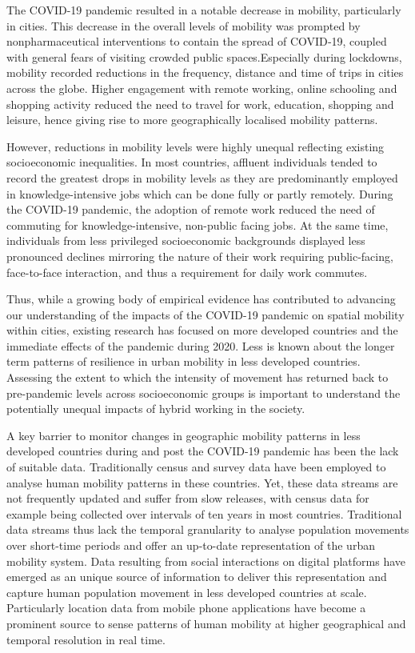 \documentclass[
  11pt,
]{article}
\begin{document}
The COVID-19 pandemic resulted in a notable decrease in mobility,
particularly in cities. This decrease in the overall levels of mobility
was prompted by nonpharmaceutical interventions to contain the spread of
COVID‐19, coupled with general fears of visiting crowded public
spaces.Especially during lockdowns, mobility recorded reductions in the
frequency, distance and time of trips in cities across the globe. Higher
engagement with remote working, online schooling and shopping activity
reduced the need to travel for work, education, shopping and leisure,
hence giving rise to more geographically localised mobility patterns.

However, reductions in mobility levels were highly unequal reflecting
existing socioeconomic inequalities. In most countries, affluent
individuals tended to record the greatest drops in mobility levels as
they are predominantly employed in knowledge-intensive jobs which can be
done fully or partly remotely. During the COVID-19 pandemic, the
adoption of remote work reduced the need of commuting for
knowledge-intensive, non-public facing jobs. At the same time,
individuals from less privileged socioeconomic backgrounds displayed
less pronounced declines mirroring the nature of their work requiring
public-facing, face-to-face interaction, and thus a requirement for
daily work commutes.

Thus, while a growing body of empirical evidence has contributed to
advancing our understanding of the impacts of the COVID-19 pandemic on
spatial mobility within cities, existing research has focused on more
developed countries and the immediate effects of the pandemic during
2020. Less is known about the longer term patterns of resilience in
urban mobility in less developed countries. Assessing the extent to
which the intensity of movement has returned back to pre-pandemic levels
across socioeconomic groups is important to understand the potentially
unequal impacts of hybrid working in the society.

A key barrier to monitor changes in geographic mobility patterns in less
developed countries during and post the COVID-19 pandemic has been the
lack of suitable data. Traditionally census and survey data have been
employed to analyse human mobility patterns in these countries. Yet,
these data streams are not frequently updated and suffer from slow
releases, with census data for example being collected over intervals of
ten years in most countries. Traditional data streams thus lack the
temporal granularity to analyse population movements over short-time
periods and offer an up-to-date representation of the urban mobility
system. Data resulting from social interactions on digital platforms
have emerged as an unique source of information to deliver this
representation and capture human population movement in less developed
countries at scale. Particularly location data from mobile phone
applications have become a prominent source to sense patterns of human
mobility at higher geographical and temporal resolution in real time.
\end{document}
